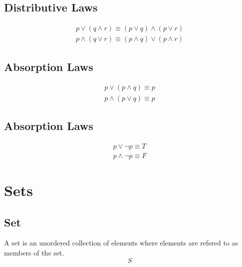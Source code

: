 \documentclass[12pt]{article}
\begin{document}
\subsection{Distributive Laws}

\begin{subequations}\label{distributive}
\begin{align}
p \lor (q \wedge r) \equiv (p \lor q) \wedge (p \lor r)\label{distr_first}\\
p \wedge (q \lor r) \equiv (p \wedge q) \lor (p \wedge r)\label{distr_second}
\end{align}
\end{subequations}

\subsection{Absorption Laws}

\begin{subequations}\label{absorption}
\begin{align}
p \lor (p \wedge q) \equiv p\label{absorb_first}\\
p \wedge (p \lor q) \equiv p\label{absorb_second}
\end{align}
\end{subequations}

\subsection{Absorption Laws}

\begin{subequations}\label{negation}
\begin{align}
p \lor \neg p\equiv T\label{neg_first}\\
p \wedge \neg p \equiv F\label{neg_second}
\end{align}
\end{subequations}
%
%
%
%
%
%
\pagebreak
\section{Sets}
\setcounter{equation}{0}

\subsection{Set}
A set is an unordered collection of elements where elements are refered to as members of the set.
\begin{equation}
S
\end{equation}
\end{document}
